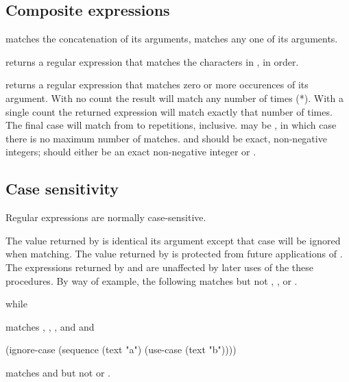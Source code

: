 \subsection{Composite expressions}

\begin{protos}
\end{protos}
\noindent
{} matches the concatenation of its arguments,  matches
any one of its arguments.

\begin{protos}
\end{protos}
\noindent
{} returns a regular expression that matches the characters in
 , in order.

\begin{protos}
\end{protos}
\noindent
{} returns a regular expression that matches zero or more
occurences of its  argument.  With no count the result
will match any number of times (*).  With a single
count the returned expression will match
  exactly that number of times.
The final case will match from  to 
 repetitions, inclusive.
 may be , in which case there
 is no maximum number of matches.
 and  should be exact, non-negative integers;
  should either be an exact non-negative integer or .

\subsection{Case sensitivity}

Regular expressions are normally case-sensitive.
\begin{protos}
\end{protos}
\noindent
The value returned by
  is identical its argument except that case will be
 ignored when matching.
The value returned by  is protected
 from future applications of .
The expressions returned
 by  and  are unaffected by later uses of the
 these procedures.
By way of example, the following matches  but not ,
 , or .
\begin{example}
\end{example}
\noindent
while
\begin{example}
\end{example}
\noindent
matches , ,
 , and  and
\begin{example}
(ignore-case (sequence (text "a")
                       (use-case (text "b"))))
\end{example}
\noindent
matches  and  but not  or .

